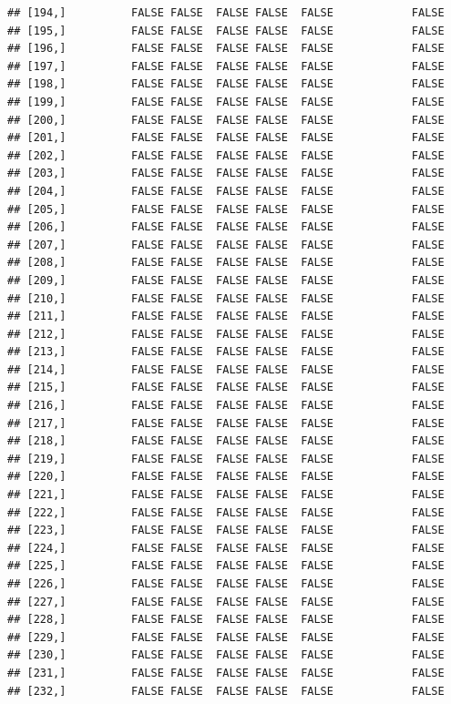 \documentclass[
  english,
  man,floatsintext]{apa6}
\begin{document}
\begin{verbatim}
## [194,]          FALSE FALSE  FALSE FALSE  FALSE            FALSE
## [195,]          FALSE FALSE  FALSE FALSE  FALSE            FALSE
## [196,]          FALSE FALSE  FALSE FALSE  FALSE            FALSE
## [197,]          FALSE FALSE  FALSE FALSE  FALSE            FALSE
## [198,]          FALSE FALSE  FALSE FALSE  FALSE            FALSE
## [199,]          FALSE FALSE  FALSE FALSE  FALSE            FALSE
## [200,]          FALSE FALSE  FALSE FALSE  FALSE            FALSE
## [201,]          FALSE FALSE  FALSE FALSE  FALSE            FALSE
## [202,]          FALSE FALSE  FALSE FALSE  FALSE            FALSE
## [203,]          FALSE FALSE  FALSE FALSE  FALSE            FALSE
## [204,]          FALSE FALSE  FALSE FALSE  FALSE            FALSE
## [205,]          FALSE FALSE  FALSE FALSE  FALSE            FALSE
## [206,]          FALSE FALSE  FALSE FALSE  FALSE            FALSE
## [207,]          FALSE FALSE  FALSE FALSE  FALSE            FALSE
## [208,]          FALSE FALSE  FALSE FALSE  FALSE            FALSE
## [209,]          FALSE FALSE  FALSE FALSE  FALSE            FALSE
## [210,]          FALSE FALSE  FALSE FALSE  FALSE            FALSE
## [211,]          FALSE FALSE  FALSE FALSE  FALSE            FALSE
## [212,]          FALSE FALSE  FALSE FALSE  FALSE            FALSE
## [213,]          FALSE FALSE  FALSE FALSE  FALSE            FALSE
## [214,]          FALSE FALSE  FALSE FALSE  FALSE            FALSE
## [215,]          FALSE FALSE  FALSE FALSE  FALSE            FALSE
## [216,]          FALSE FALSE  FALSE FALSE  FALSE            FALSE
## [217,]          FALSE FALSE  FALSE FALSE  FALSE            FALSE
## [218,]          FALSE FALSE  FALSE FALSE  FALSE            FALSE
## [219,]          FALSE FALSE  FALSE FALSE  FALSE            FALSE
## [220,]          FALSE FALSE  FALSE FALSE  FALSE            FALSE
## [221,]          FALSE FALSE  FALSE FALSE  FALSE            FALSE
## [222,]          FALSE FALSE  FALSE FALSE  FALSE            FALSE
## [223,]          FALSE FALSE  FALSE FALSE  FALSE            FALSE
## [224,]          FALSE FALSE  FALSE FALSE  FALSE            FALSE
## [225,]          FALSE FALSE  FALSE FALSE  FALSE            FALSE
## [226,]          FALSE FALSE  FALSE FALSE  FALSE            FALSE
## [227,]          FALSE FALSE  FALSE FALSE  FALSE            FALSE
## [228,]          FALSE FALSE  FALSE FALSE  FALSE            FALSE
## [229,]          FALSE FALSE  FALSE FALSE  FALSE            FALSE
## [230,]          FALSE FALSE  FALSE FALSE  FALSE            FALSE
## [231,]          FALSE FALSE  FALSE FALSE  FALSE            FALSE
## [232,]          FALSE FALSE  FALSE FALSE  FALSE            FALSE

\end{verbatim}
\end{document}
